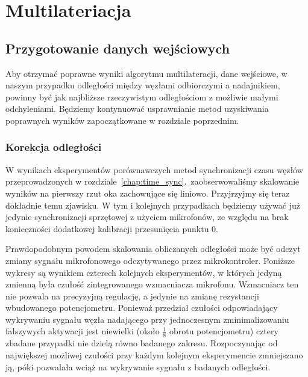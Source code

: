 \chapter{Multilateriacja}\label{chap:multilateration}

\section{Przygotowanie danych wejściowych}

Aby otrzymać poprawne wyniki algorytmu multilateracji, dane wejściowe, w naszym przypadku odległości między węzłami odbiorczymi a nadajnikiem, powinny być jak najbliższe rzeczywistym odległościom z możliwie małymi odchyleniami. Będziemy kontynuować usprawnianie metod uzyskiwania poprawnych wyników zapoczątkowane w rozdziale poprzednim.

\subsection{Korekcja odległości}

W wynikach eksperymentów porównawczych metod synchronizacji czasu węzłów przeprowadzonych w rozdziale~\ref{chap:time_sync}.\ zaobserwowaliśmy skalowanie wyników na pierwszy rzut oka zachowujące się liniowo. Przyjrzyjmy się teraz dokładnie temu zjawisku. W tym i kolejnych przypadkach będziemy używać już jedynie synchronizacji sprzętowej z użyciem mikrofonów, ze względu na brak konieczności dodatkowej kalibracji przesunięcia punktu 0.

Prawdopodobnym powodem skalowania obliczanych odległości może być odczyt zmiany sygnału mikrofonowego odczytywanego przez mikrokontroler. Poniższe wykresy są wynikiem czterech kolejnych eksperymentów, w których jedyną zmienną była czułość zintegrowanego wzmacniacza mikrofonu. Wzmacniacz ten nie pozwala na precyzyjną regulację, a jedynie na zmianę rezystancji wbudowanego potencjometru. Ponieważ przedział czułości odpowiadający wykrywaniu sygnału węzła nadającego przy jednoczesnym zminimalizowaniu fałszywych aktywacji jest niewielki (około $\frac{1}{8}$ obrotu potencjometru) cztery zbadane przypadki nie dzielą równo badanego zakresu. Rozpoczynając od największej możliwej czułości przy każdym kolejnym eksperymencie zmniejszano ją, póki pozwalała wciąż na wykrywanie sygnału z badanych odległości.

